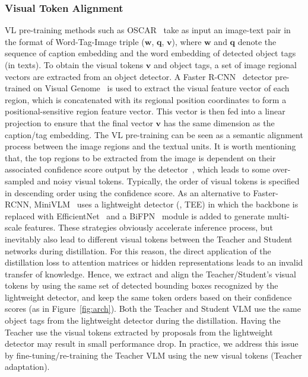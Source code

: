 \subsubsection{Visual Token Alignment}
VL pre-training methods such as  OSCAR~\cite{li2020oscar} take as input an image-text pair in the format of Word-Tag-Image triple ($\boldsymbol{w}$, $\boldsymbol{q}$, $\boldsymbol{v}$), where $\boldsymbol{w}$ and $\boldsymbol{q}$ denote the sequence of caption embedding and the word embedding of detected object tags (in texts). 
To obtain the visual tokens $\boldsymbol{v}$ and object tags, a set of image regional vectors are extracted from an object detector. A Faster R-CNN~\cite{NIPS2015_14bfa6bb} detector pre-trained on Visual Genome~\cite{krishna2017visual} is used to extract the visual feature vector of each region, which is concatenated with its regional position coordinates to form a positional-sensitive region feature vector. This vector is then fed into a linear projection to ensure that the final vector $\boldsymbol{v}$ has the same dimension as the caption/tag embedding. The VL pre-training can be seen as a semantic alignment process between the image regions and the textual units. It is worth mentioning that, the top regions to be extracted from the image
is dependent on their associated confidence score output by the detector~\cite{wang2020minivlm}, which leads to some over-sampled and noisy visual tokens. Typically, the order of visual tokens is specified in descending order using the confidence score.
As an alternative to Faster-RCNN, MiniVLM~\cite{wang2020minivlm} uses a lightweight detector (\ie, TEE) in which the backbone is replaced with EfficientNet~\cite{tan2019efficientnet} and a BiFPN~\cite{tan2020efficientdet} module is added to generate multi-scale features. These strategies obviously accelerate inference process, but inevitably also lead to different visual tokens between the Teacher and Student networks during distillation. For this reason, the direct application of the distillation loss to attention matrices or hidden representations leads to an invalid transfer of knowledge. Hence, we extract and align the Teacher/Student's visual tokens by using the same set of detected bounding boxes recognized by the lightweight detector, and keep the same token orders based on their confidence scores (as in Figure~\ref{fig:arch}). Both the Teacher and Student VLM use the same object tags from the lightweight detector during the distillation. Having the Teacher use the visual tokens extracted by proposals from the lightweight detector may result in small performance drop. In practice, we address this issue by fine-tuning/re-training the Teacher VLM using the new visual tokens (Teacher adaptation).


